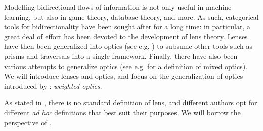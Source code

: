 \documentclass[11pt,a4paper,openright,twoside]{report}
\theoremstyle{plain}
\theoremstyle{definition}
\begin{document}
Modelling bidirectional flows of information is not only useful in machine learning, but also in game theory, database theory, and more. As such, categorical tools for bidirectionality have been sought after for a long time: in particular, a great deal of effort has been devoted to the development of lens theory. Lenses have then been generalized into optics (see e.g. \cite{riley2018categories}) to subsume other tools such as prisms and traversals into a single framework. Finally, there have also been various attempts to generalize optics (see e.g. \cite{clarke2024profunctor} for a definition of mixed optics). We will introduce lenses and optics, and focus on the generalization of optics introduced by \cite{gavranovic2024fundamental}: \textit{weighted optics}. 

As stated in \cite{gavranovic2024fundamental}, there is no standard definition of lens, and different authors opt for different \textit{ad hoc} definitions that best suit their purposes. We will borrow the perspective of \cite{cruttwell2022categorical}.
\end{document}
